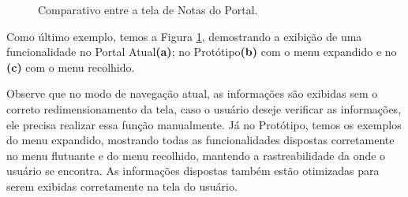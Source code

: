 \documentclass[12pt]{article}
\begin{document}
\begin{figure}[!htb]
  \caption{Comparativo entre a tela de Notas do Portal.}
  \label{figura17}
\end{figure}
Como último exemplo, temos a Figura \ref{figura17}, demostrando a exibição de uma funcionalidade no Portal Atual\textbf{(a)}; no Protótipo\textbf{(b)} com o menu expandido e no \textbf{(c)} com o menu recolhido. 

Observe que no modo de navegação atual, as informações são exibidas sem o correto redimensionamento da tela, caso o usuário deseje verificar as informações, ele precisa realizar essa função manualmente. Já no Protótipo, temos os exemplos do menu expandido, mostrando todas as funcionalidades dispostas corretamente no menu flutuante e do menu recolhido, mantendo a rastreabilidade da onde o usuário se encontra. As informações dispostas também estão otimizadas para serem exibidas corretamente na tela do usuário.
\end{document}

